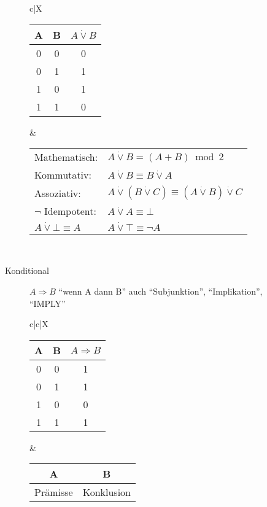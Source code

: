 \begin{description}
\begin{description}
        \begin{tabularx}{\linewidth}{c|X}
            \begin{tabular}[t]{c|c||c}
                A & B & $A \dot{\vee} B$ \\ \hline\hline
                0 & 0 & 0                \\ \hline
                0 & 1 & 1                \\ \hline
                1 & 0 & 1                \\ \hline
                1 & 1 & 0
            \end{tabular} &
            \begin{tabular}[t]{ll}
                Mathematisch:                & $A \dot{\vee} B = (A + B)\bmod 2$                                    \\
                Kommutativ:                  & $A \dot{\vee} B \equiv B \dot{\vee} A$                               \\
                Assoziativ:                  & $A \dot{\vee} (B \dot{\vee} C) \equiv (A \dot{\vee} B) \dot{\vee} C$ \\
                $\neg$ Idempotent:           & $A \dot{\vee} A \equiv \bot$                                         \\
                $A \dot{\vee} \bot \equiv A$ & $A \dot{\vee} \top \equiv \neg A$
            \end{tabular} \\ \hline
        \end{tabularx}
        \item[Konditional] $A\Rightarrow B$ ``wenn A dann B'' auch ``Subjunktion'', ``Implikation'', ``IMPLY'' \\
        \begin{tabularx}{\linewidth}{c|c|X}
            \begin{tabular}[t]{c|c||c}
                A & B & $A \Rightarrow B$ \\ \hline\hline
                0 & 0 & 1                 \\ \hline
                0 & 1 & 1                 \\ \hline
                1 & 0 & 0                 \\ \hline
                1 & 1 & 1
            \end{tabular} &
            \begin{tabular}[t]{c|c}
                A             & B          \\ \hline
                Prämisse      & Konklusion \\

\end{tabular}
\end{tabularx}
\end{description}
\end{description}
